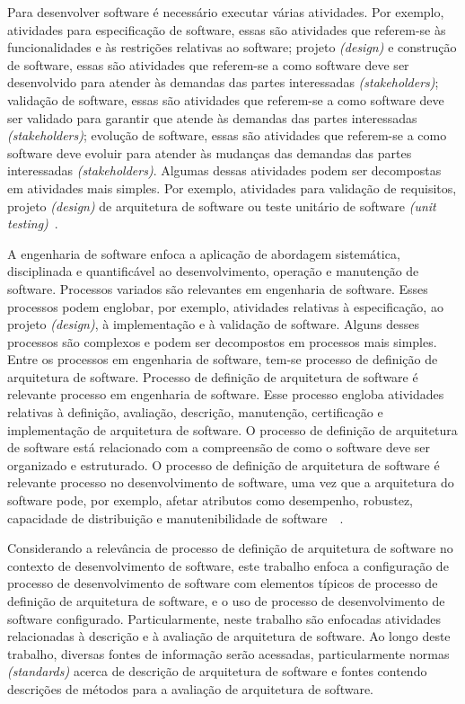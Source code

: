 Para desenvolver software é necessário executar várias atividades. Por exemplo, atividades para especificação de software, essas são atividades que referem-se às funcionalidades e às restrições relativas ao software; projeto \emph{(design)} e construção de software, essas são atividades que referem-se a como software deve ser desenvolvido para atender às demandas das partes interessadas \emph{(stakeholders)}; validação de software, essas são atividades que referem-se a como software deve ser validado para garantir que atende às demandas das partes interessadas \emph{(stakeholders)}; evolução de software, essas são atividades que referem-se a como software deve evoluir para atender às mudanças das demandas das partes interessadas \emph{ (stakeholders)}. Algumas dessas atividades podem ser decompostas em atividades mais simples. Por exemplo, atividades para validação de requisitos,  projeto \emph{(design)} de arquitetura de software ou teste unitário de software \emph{(unit testing)}~\cite{Sommerville_2011_texbook}.

A engenharia de software enfoca a aplicação de abordagem sistemática, disciplinada e quantificável ao desenvolvimento, operação e manutenção de software. Processos variados são relevantes em engenharia de software. Esses processos podem englobar, por exemplo, atividades relativas à especificação, ao projeto \emph{(design)}, à implementação e à validação de software. Alguns desses processos são complexos e podem ser decompostos em processos mais simples. Entre os processos em engenharia de software, tem-se processo de definição de arquitetura de software. Processo de definição de arquitetura de software é relevante processo em engenharia de software. Esse processo engloba atividades relativas à definição, avaliação, descrição, manutenção, certificação e implementação de arquitetura de software. O processo de definição de arquitetura de software está relacionado com a compreensão de como o software deve ser organizado e estruturado. O processo de definição de arquitetura de software é relevante processo no desenvolvimento de software, uma vez que a arquitetura do software pode, por exemplo, afetar atributos como desempenho, robustez, capacidade de distribuição e manutenibilidade de software~\cite{Sommerville_2011_texbook}~\cite{Swebok}. 

Considerando a relevância de processo de definição de arquitetura de software no contexto de desenvolvimento de software, este trabalho enfoca a configuração de processo de desenvolvimento de software com elementos típicos de processo de definição de arquitetura de software, e o uso de processo de desenvolvimento de software configurado. Particularmente, neste trabalho são enfocadas atividades relacionadas à descrição e à avaliação de arquitetura de software. Ao longo deste trabalho, diversas fontes de informação serão acessadas, particularmente normas \emph{(standards)}  acerca de descrição de arquitetura de software e fontes contendo descrições de métodos para a avaliação de arquitetura de software.

